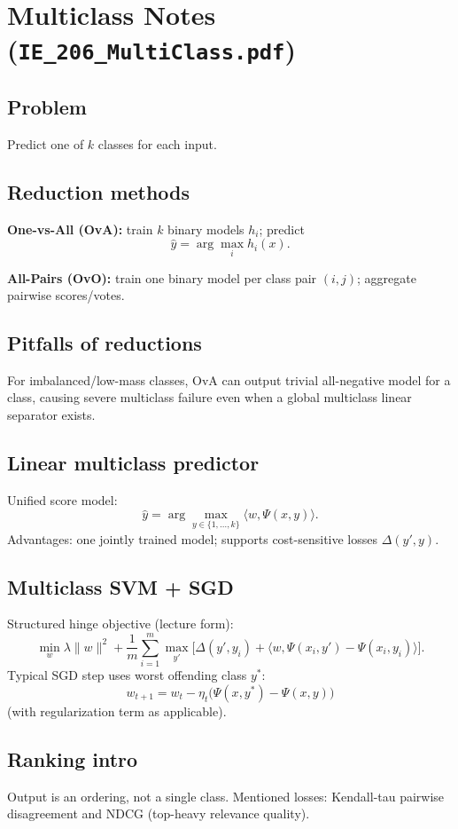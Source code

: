 \documentclass[11pt]{article}
\newcommand{\1}{\mathbf{1}}
\begin{document}
\section{Multiclass Notes (\texttt{IE\_206\_MultiClass.pdf})}
\subsection*{Problem}
Predict one of $k$ classes for each input.

\subsection*{Reduction methods}
\textbf{One-vs-All (OvA):}
train $k$ binary models $h_i$; predict
\[
\hat y=\arg\max_i h_i(x).
\]

\textbf{All-Pairs (OvO):}
train one binary model per class pair $(i,j)$; aggregate pairwise scores/votes.

\subsection*{Pitfalls of reductions}
For imbalanced/low-mass classes, OvA can output trivial all-negative model for a class, causing severe multiclass failure even when a global multiclass linear separator exists.

\subsection*{Linear multiclass predictor}
Unified score model:
\[
\hat y=\arg\max_{y\in\{1,\dots,k\}} \langle w,\Psi(x,y)\rangle.
\]
Advantages: one jointly trained model; supports cost-sensitive losses $\Delta(y',y)$.

\subsection*{Multiclass SVM + SGD}
Structured hinge objective (lecture form):
\[
\min_w\lambda\|w\|^2+\frac1m\sum_{i=1}^m \max_{y'}\Big[\Delta(y',y_i)+\langle w,\Psi(x_i,y')-\Psi(x_i,y_i)\rangle\Big].
\]
Typical SGD step uses worst offending class $y^*$:
\[
w_{t+1}=w_t-\eta_t\big(\Psi(x,y^*)-\Psi(x,y)\big)
\]
(with regularization term as applicable).

\subsection*{Ranking intro}
Output is an ordering, not a single class. Mentioned losses: Kendall-tau pairwise disagreement and NDCG (top-heavy relevance quality).
\end{document}
